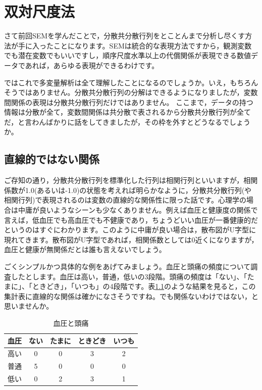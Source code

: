 \documentclass{ltjsbook}
\begin{document}
 
\chapter{双対尺度法}
\label{chapter14} 


さて前回SEMを学んだことで，分散共分散行列をとことんまで分析し尽くす方法が手に入ったことになります。SEMは統合的な表現方法ですから，観測変数でも潜在変数でもいいですし，順序尺度水準以上の代償関係が表現できる数値データであれば，あらゆる表現ができるわけです。

ではこれで多変量解析は全て理解したことになるのでしょうか。いえ，もちろんそうではありません。分散共分散行列の分解はできるようになりましたが，変数間関係の表現は分散共分散行列だけではありません。
ここまで，データの持つ情報は分散が全て，変数間関係は共分散で表されるから分散共分散行列が全てだ，と言わんばかりに話をしてきましたが，その枠を外すとどうなるでしょうか。

\section{直線的ではない関係}

ご存知の通り，分散共分散行列を標準化した行列は相関行列といいますが，相関係数が1.0(あるいは-1.0)の状態を考えれば明らかなように，分散共分散行列(や相関行列)で表現されるのは変数の直線的な関係性に限った話です。心理学の場合は中庸が良いようなシーンも少なくありません。例えば血圧と健康度の関係で言えば，低血圧でも高血圧でも不健康であり，ちょうどいい血圧が一番健康的だというのはすぐにわかります。このように中庸が良い場合は，散布図がU字型に現れてきます。散布図がU字型であれば，相関係数としては0近くになりますが，血圧と健康が無関係だとは誰も言えないでしょう。

ごくシンプルかつ具体的な例をあげてみましょう。血圧と頭痛の頻度について調査したとします。血圧は高い，普通，低いの3段階。頭痛の頻度は「ない」、「たまに」、「ときどき」，「いつも」の4段階です。表\ref{tbl::14_01}のような結果を見ると，この集計表に直線的な関係は確かになさそうですね。でも関係ないわけではない，と思いませんか。
\begin{table}[h]
	\begin{center}
	\caption{血圧と頭痛}
	\begin{tabular}{c|cccc}
	血圧&ない&たまに&ときどき&いつも\\
	\hline
	高い&0&0&3&2\\
	普通&5&0&0&0\\
	低い&0&2&3&1\\
	\end{tabular}
	\label{tbl::14_01}
	\end{center}
\end{table}
\end{document}
